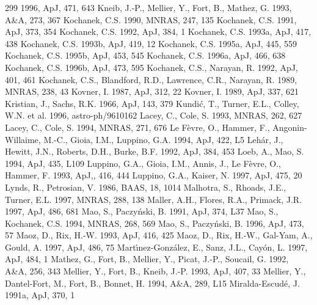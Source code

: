 \documentclass[a4paper,10pt]{article} %
\begin{document}
\begin{thebibliography}{299}
  1996, ApJ, 471, 643
  Kneib, J.-P., Mellier, Y., Fort, B., Mathez, G. 1993, A\&A, 273, 367
  Kochanek, C.S. 1990, MNRAS, 247, 135
  Kochanek, C.S. 1991, ApJ, 373, 354
  Kochanek, C.S. 1992, ApJ, 384, 1
  Kochanek, C.S. 1993a, ApJ, 417, 438
  Kochanek, C.S. 1993b, ApJ, 419, 12
  Kochanek, C.S. 1995a, ApJ, 445, 559
  Kochanek, C.S. 1995b, ApJ, 453, 545
  Kochanek, C.S. 1996a, ApJ, 466, 638
  Kochanek, C.S. 1996b, ApJ, 473, 595
  Kochanek, C.S., Narayan, R. 1992, ApJ, 401, 461
  Kochanek, C.S., Blandford, R.D., Lawrence, C.R., Narayan, R. 1989,
  MNRAS, 238, 43
  Kovner, I. 1987, ApJ, 312, 22
  Kovner, I. 1989, ApJ, 337, 621
  Kristian, J., Sachs, R.K. 1966, ApJ, 143, 379
  Kundi\'c, T., Turner, E.L., Colley, W.N. et al. 1996,
  astro-ph/9610162
  Lacey, C., Cole, S. 1993, MNRAS, 262, 627
  Lacey, C., Cole, S. 1994, MNRAS, 271, 676
  Le F\`evre, O., Hammer, F., Angonin-Willaime, M.-C., Gioia, I.M.,
  Luppino, G.A. 1994, ApJ, 422, L5
  Leh\'ar, J., Hewitt, J.N., Roberts, D.H., Burke, B.F. 1992, ApJ,
  384, 453
  Loeb, A., Mao, S. 1994, ApJ, 435, L109
  Luppino, G.A., Gioia, I.M., Annis, J., Le F\`evre, O., Hammer,
  F. 1993, ApJ,, 416, 444
  Luppino, G.A., Kaiser, N. 1997, ApJ, 475, 20
  Lynds, R., Petrosian, V. 1986, BAAS, 18, 1014
  Malhotra, S., Rhoads, J.E., Turner, E.L. 1997, MNRAS, 288, 138
  Maller, A.H., Flores, R.A., Primack, J.R. 1997, ApJ, 486, 681
  Mao, S., Paczy\'nski, B. 1991, ApJ, 374, L37
  Mao, S., Kochanek, C.S. 1994, MNRAS, 268, 569
  Mao, S., Paczy\'nski, B. 1996, ApJ, 473, 57
  Maoz, D., Rix, H.-W. 1993, ApJ, 416, 425
  Maoz, D., Rix, H.-W., Gal-Yam, A., Gould, A. 1997, ApJ, 486, 75
  Mart{\'\i}nez-Gonz\'alez, E., Sanz, J.L., Cay\'on, L. 1997, ApJ,
  484, 1
  Mathez, G., Fort, B., Mellier, Y., Picat, J.-P., Soucail, G. 1992,
  A\&A, 256, 343
  Mellier, Y., Fort, B., Kneib, J.-P. 1993, ApJ, 407, 33
  Mellier, Y., Dantel-Fort, M., Fort, B., Bonnet, H. 1994, A\&A, 289,
  L15
  Miralda-Escud\'e, J. 1991a, ApJ, 370, 1

\end{thebibliography}
\end{document}
